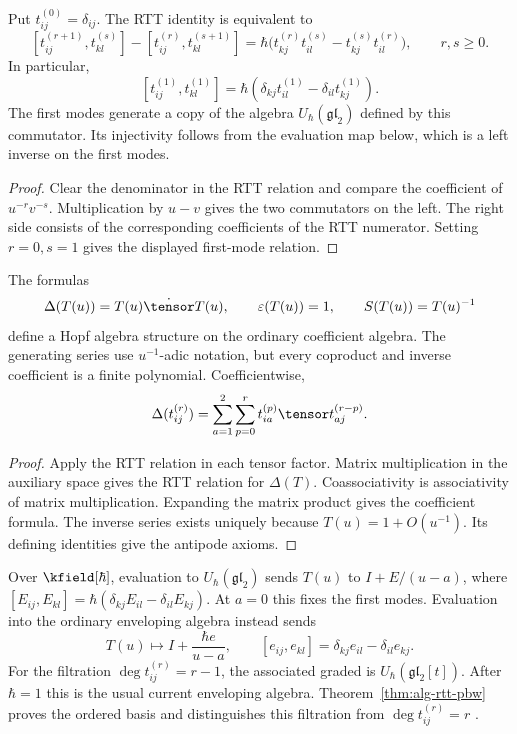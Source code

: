 \begin{proposition}
Put $t_{ij}^{(0)}=\delta_{ij}$. The RTT identity is equivalent to
\[
 [t_{ij}^{(r+1)},t_{kl}^{(s)}]-[t_{ij}^{(r)},t_{kl}^{(s+1)}]
 =\hbar\bigl(t_{kj}^{(r)}t_{il}^{(s)}-t_{kj}^{(s)}t_{il}^{(r)}\bigr),
 \qquad r,s\ge0.
\]
In particular,
\[
 [t_{ij}^{(1)},t_{kl}^{(1)}]
 =\hbar(\delta_{kj}t_{il}^{(1)}-\delta_{il}t_{kj}^{(1)}).
\]
The first modes generate a copy of the algebra $U_\hbar(\mathfrak{gl}_2)$ defined by this commutator.
Its injectivity follows from the evaluation map below, which is a left inverse on the first modes.
\end{proposition}
\begin{proof}
Clear the denominator in the RTT relation and compare the coefficient of $u^{-r}v^{-s}$. Multiplication by $u-v$ gives the two commutators on the left.
The right side consists of the corresponding coefficients of the RTT numerator. Setting $r=0,s=1$ gives the displayed first-mode relation.
\end{proof}

\begin{theorem}
The formulas
\[
 \Delta(T(u))=T(u)\dot\tensor T(u),\qquad
 \varepsilon(T(u))=1,\qquad
 S(T(u))=T(u)^{-1}
\]
define a Hopf algebra structure on the ordinary coefficient algebra.
The generating series use $u^{-1}$-adic notation, but every coproduct and inverse coefficient is a finite polynomial. Coefficientwise,
\[
 \Delta(t_{ij}^{(r)})
 =\sum_{a=1}^{2}\sum_{p=0}^{r}
 t_{ia}^{(p)}\tensor t_{aj}^{(r-p)}.
\]
\end{theorem}
\begin{proof}
Apply the RTT relation in each tensor factor. Matrix multiplication in the auxiliary space gives the RTT relation for $\Delta(T)$. Coassociativity is associativity of matrix multiplication. Expanding the matrix product gives the coefficient formula. The inverse series exists uniquely because $T(u)=1+O(u^{-1})$. Its defining identities give the antipode axioms.
\end{proof}

Over $\kfield[\hbar]$, evaluation to $U_\hbar(\mathfrak{gl}_2)$ sends
$T(u)$ to $I+E/(u-a)$, where $[E_{ij},E_{kl}]=\hbar(\delta_{kj}E_{il}-\delta_{il}E_{kj})$.
At $a=0$ this fixes the first modes.
Evaluation into the ordinary enveloping algebra instead sends
\[
 T(u)\longmapsto I+\frac{\hbar e}{u-a},
 \qquad [e_{ij},e_{kl}]=\delta_{kj}e_{il}-\delta_{il}e_{kj}.
\]
For the filtration $\deg t_{ij}^{(r)}=r-1$, the associated graded is
$U_\hbar(\mathfrak{gl}_2[t])$. After $\hbar=1$ this is the usual current enveloping algebra.
Theorem~\ref{thm:alg-rtt-pbw} proves the ordered basis and distinguishes this filtration from $\deg t_{ij}^{(r)}=r$ \cite{Molev,DrinfeldYangian}.

